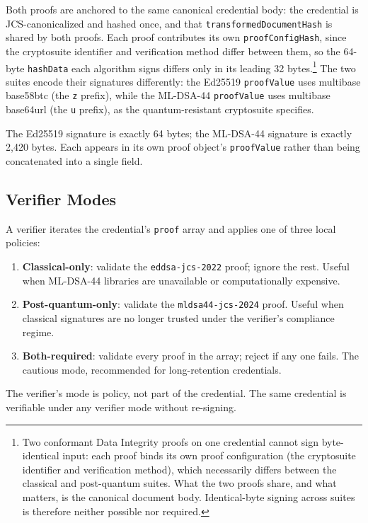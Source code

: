 \documentclass[11pt,a4paper]{article}
\begin{document}
Both proofs are anchored to the same canonical credential body: the credential is JCS-canonicalized and hashed once, and that \verb|transformedDocumentHash| is shared by both proofs. Each proof contributes its own \verb|proofConfigHash|, since the cryptosuite identifier and verification method differ between them, so the 64-byte \verb|hashData| each algorithm signs differs only in its leading 32 bytes.\footnote{Two conformant Data Integrity proofs on one credential cannot sign byte-identical input: each proof binds its own proof configuration (the cryptosuite identifier and verification method), which necessarily differs between the classical and post-quantum suites. What the two proofs share, and what matters, is the canonical document body. Identical-byte signing across suites is therefore neither possible nor required.} The two suites encode their signatures differently: the Ed25519 \verb|proofValue| uses multibase base58btc (the \texttt{z} prefix), while the ML-DSA-44 \verb|proofValue| uses multibase base64url (the \texttt{u} prefix), as the quantum-resistant cryptosuite specifies.

The Ed25519 signature is exactly 64 bytes; the ML-DSA-44 signature is exactly 2,420 bytes. Each appears in its own proof object's \verb|proofValue| rather than being concatenated into a single field.

\subsection{Verifier Modes}

A verifier iterates the credential's \verb|proof| array and applies one of three local policies:

\begin{enumerate}[label=\arabic*.,leftmargin=*]
\item \textbf{Classical-only}: validate the \texttt{eddsa-jcs-2022} proof; ignore the rest. Useful when ML-DSA-44 libraries are unavailable or computationally expensive.
\item \textbf{Post-quantum-only}: validate the \texttt{mldsa44-jcs-2024} proof. Useful when classical signatures are no longer trusted under the verifier's compliance regime.
\item \textbf{Both-required}: validate every proof in the array; reject if any one fails. The cautious mode, recommended for long-retention credentials.
\end{enumerate}

The verifier's mode is policy, not part of the credential. The same credential is verifiable under any verifier mode without re-signing.
\end{document}
